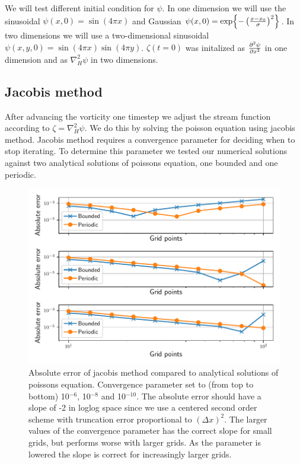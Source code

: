 We will test different initial condition for $\psi$. In one dimension we will
use the sinusoidal $\psi(x, 0) = \sin{(4 \pi x)}$ and Gaussian $\psi(x, 0) =
\exp{-\left(\frac{x - x_0}{\sigma}\right)^2}$.
In two dimensions we will use a two-dimensional sinusoidal $\psi(x,y,0) =
\sin{(4 \pi x)} \sin{(4 \pi y)}$. $ \zeta(t=0) $ was initalized as $
\pdv[2]{\psi}{x} $ in one dimension and as $\nabla_H^2 \psi$ in two dimensions.


\subsection{Jacobis method}

After advancing the vorticity one timestep we adjust the stream function
according to $\zeta = \nabla_H^2 \psi$.  We do this by solving the poisson
equation using
jacobis method. Jacobis method requires a convergence parameter for deciding
when to stop iterating. To determine this parameter we tested our
numerical solutions  against two analytical solutions
of poissons equation, one bounded and one periodic.

\begin{figure}[h]
  \centering
  \includegraphics[width=\textwidth]{../figures/error_jacobi.pdf}
  \caption{Absolute error of jacobis method
  compared to analytical solutions of poissons equation. Convergence parameter set to (from top to bottom) 10$^{-6}$, 10$^{-8}$ and 10$^{-10}$.
  The absolute error should have a slope of -2 in loglog space since we use
  a centered second order scheme with truncation error proportional to $(\Delta x)^2$.
  The larger values of the convergence parameter has the correct slope for small
  grids, but performs worse with larger grids. As the parameter is lowered the
  slope is correct for increasingly larger grids.}
  \label{fig:error_jacobi}
\end{figure}

